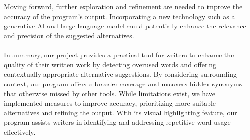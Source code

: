\documentclass[12pt,oneside,openright,a4paper]{cpe-english-project}
\begin{document}
\\\\
Moving forward, further exploration and refinement are needed to improve the accuracy of the program's output. Incorporating a new technology such as a generative AI and large language model could potentially enhance the relevance and precision of the suggested alternatives.
\\\\
In summary, our project provides a practical tool for writers to enhance the quality of their written work by detecting overused words and offering contextually appropriate alternative suggestions. By considering surrounding context, our program offers a broader coverage and uncovers hidden synonyms that otherwise missed by other tools. While limitations exist, we have implemented measures to improve accuracy, prioritizing more suitable alternatives and refining the output. With its visual highlighting feature, our program assists writers in identifying and addressing repetitive word usage effectively.




%
%
%


\end{document}

